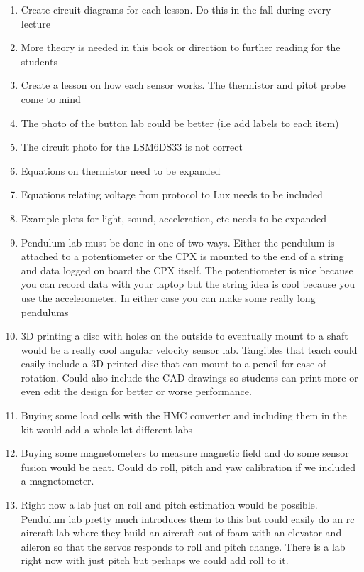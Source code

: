 \documentclass{article}
\begin{document}
\begin{enumerate}[itemsep=-5pt]
\item Create circuit diagrams for each lesson. Do this in the fall during every lecture
\item More theory is needed in this book or direction to further
  reading for the students
\item Create a lesson on how each sensor works. The thermistor and pitot probe come to mind 
\item The photo of the button lab could be better (i.e add labels to
  each item)
\item The circuit photo for the LSM6DS33 is not correct
\item Equations on thermistor need to be expanded
\item Equations relating voltage from protocol to Lux needs to be included
\item Example plots for light, sound, acceleration, etc needs to be expanded
\item Pendulum lab must be done in one of two ways. Either the pendulum is attached to a potentiometer or the CPX is mounted to the end of a string and data logged on board the CPX itself. The potentiometer is nice because you can record data with your laptop but the string idea is cool because you use the accelerometer. In either case you can make some really long pendulums
\item 3D printing a disc with holes on the outside to eventually mount to a shaft would be a really cool angular velocity sensor lab. Tangibles that teach could easily include a 3D printed disc that can mount to a pencil for ease of rotation. Could also include the CAD drawings so students can print more or even edit the design for better or worse performance.
\item Buying some load cells with the HMC converter and including them in the kit would add a whole lot different labs
\item Buying some magnetometers to measure magnetic field and do some sensor fusion would be neat. Could do roll, pitch and yaw calibration if we included a magnetometer.
\item Right now a lab just on roll and pitch estimation would be possible. Pendulum lab pretty much introduces them to this but could easily do an rc aircraft lab where they build an aircraft out of foam with an elevator and aileron so that the servos responds to roll and pitch change. There is a lab right now with just pitch but perhaps we could add roll to it.

\end{enumerate}
\end{document}
